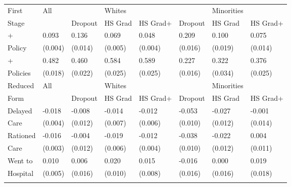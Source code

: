 \documentclass{article}
\begin{document}
\begin{table}[tbp] \centering
{}

{\normalsize
\begin{tabularx}{\textwidth}{C|C|CCC|CCC}

\toprule
\midrule First&All&&Whites&&&Minorities& \tabularnewline \addlinespace[.05in]
Stage&&Dropout&HS Grad&HS Grad+&Dropout&HS Grad&HS Grad+ \tabularnewline \addlinespace[.05in]
\midrule {}+&0.093&0.136&0.069&0.048&0.209&0.100&0.075 \tabularnewline \addlinespace[.05in]
Policy&(0.004)&(0.014)&(0.005)&(0.004)&(0.016)&(0.019)&(0.014) \tabularnewline \addlinespace[.05in]
+&0.482&0.460&0.584&0.589&0.227&0.322&0.376 \tabularnewline \addlinespace[.05in]
Policies&(0.018)&(0.022)&(0.025)&(0.025)&(0.016)&(0.034)&(0.025) \tabularnewline \addlinespace[.05in]
\midrule \midrule Reduced&All&&Whites&&&Minorities& \tabularnewline \addlinespace[.05in]
Form&&Dropout&HS Grad&HS Grad+&Dropout&HS Grad&HS Grad+ \tabularnewline \addlinespace[.05in]
\midrule \midrule Delayed&-0.018&-0.008&-0.014&-0.012&-0.053&-0.027&-0.001 \tabularnewline \addlinespace[.05in]
Care&(0.004)&(0.012)&(0.007)&(0.006)&(0.010)&(0.012)&(0.014) \tabularnewline \addlinespace[.05in]
\midrule Rationed&-0.016&-0.004&-0.019&-0.012&-0.038&-0.022&0.004 \tabularnewline \addlinespace[.05in]
Care&(0.003)&(0.012)&(0.006)&(0.004)&(0.010)&(0.012)&(0.011) \tabularnewline \addlinespace[.05in]
\midrule Went to&0.010&0.006&0.020&0.015&-0.016&0.000&0.019 \tabularnewline \addlinespace[.05in]
Hospital&(0.005)&(0.016)&(0.010)&(0.008)&(0.016)&(0.016)&(0.018) \tabularnewline \addlinespace[.05in]
\bottomrule \addlinespace[1.5ex]

\end{tabularx}
}
\end{table}
\end{document}
